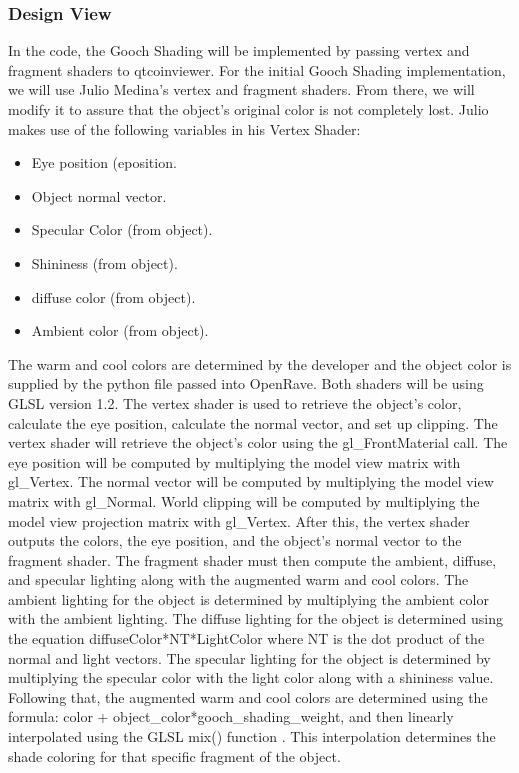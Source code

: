\documentclass[10pt,journal,compsoc,draftclsnofoot]{IEEEtran}
\begin{document}
\begin{flushleft}
\subsubsection{Design View}
In the code, the Gooch Shading will be implemented by passing vertex and fragment shaders to qtcoinviewer.
For the initial Gooch Shading implementation, we will use Julio Medina's vertex and fragment shaders.
From there, we will modify it to assure that the object's original color is not completely lost. 
Julio makes use of the following variables in his Vertex Shader:
\begin{itemize}
\item Eye position (eposition.
\item Object normal vector.
\item Specular Color (from object).
\item Shininess (from object).
\item diffuse color (from object).
\item Ambient color (from object).
\end{itemize}

The warm and cool colors are determined by the developer and the object color is supplied by the python file passed into OpenRave.
Both shaders will be using GLSL version 1.2.
The vertex shader is used to retrieve the object's color, calculate the eye position, calculate the normal vector, and set up clipping.
The vertex shader will retrieve the object's color using the gl\_FrontMaterial call.
The eye position will be computed by multiplying the model view matrix with gl\_Vertex.
The normal vector will be computed by multiplying the model view matrix with gl\_Normal.
World clipping will be computed by multiplying the model view projection matrix with gl\_Vertex.
After this, the vertex shader outputs the colors, the eye position, and the object's normal vector to the fragment shader.
The fragment shader must then compute the ambient, diffuse, and specular lighting along with the augmented warm and cool colors.
The ambient lighting for the object is determined by multiplying the ambient color with the ambient lighting.
The diffuse lighting for the object is determined using the equation diffuseColor*NT*LightColor where NT is the dot product of the normal and light vectors.
The specular lighting for the object is determined by multiplying the specular color with the light color along with a shininess value.
Following that, the augmented warm and cool colors are determined using the formula: color + object\_color*gooch\_shading\_weight, and then linearly interpolated using the GLSL mix() function \cite{glslmix}.
This interpolation determines the shade coloring for that specific fragment of the object.


\end{flushleft}
\end{document}
